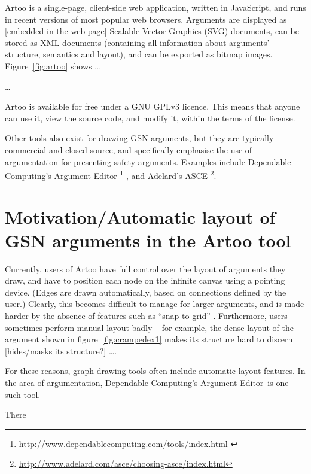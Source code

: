 Artoo is a single-page, client-side web application, written in JavaScript, and runs in recent versions of most popular web browsers.
Arguments are displayed as [embedded in the web page] Scalable Vector Graphics (SVG) documents, can be stored as XML documents (containing all information about arguments' structure, semantics  and layout), and can be exported as bitmap images.
Figure~\ref{fig:artoo} shows \ldots

\ldots

Artoo is available for free under a GNU GPLv3 licence.
This means that anyone can use it, view the source code, and modify it, within the terms of the license.

Other tools also exist for drawing GSN arguments, but they are typically commercial and closed-source,  and specifically emphasise the use of argumentation for presenting safety arguments.
Examples include Dependable Computing's Argument Editor
\footnote{\url{http://www.dependablecomputing.com/tools/index.html} \label{fn:depcomp}}
, and Adelard's ASCE 
\footnote{\url{http://www.adelard.com/asce/choosing-asce/index.html}}.


\section{Motivation/Automatic layout of GSN arguments in the Artoo tool}

Currently, users of Artoo have full control over the layout of arguments they draw, and have to position each node on the infinite canvas using a pointing device.
(Edges are drawn automatically, based on connections defined  by the user.)
Clearly, this becomes difficult to manage for larger arguments, and is made harder by the absence of features such as ``snap to grid'' .
Furthermore, users sometimes perform manual layout badly -- for example, the dense layout of the argument shown in figure~\ref{fig:crampedex1} makes its structure hard to discern [hides/masks its structure?] \ldots {}. \label{sec:cramped}

For these reasons, graph drawing tools often include automatic layout features.
In the area of argumentation, Dependable Computing's Argument Editor\ is one such tool.

There 


